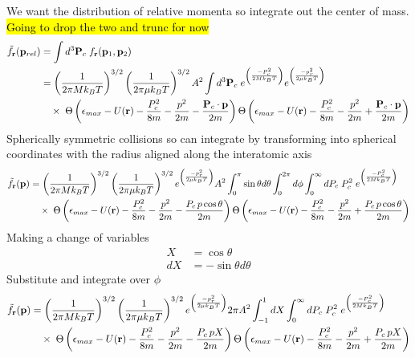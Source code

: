 We want the distribution of relative momenta so integrate out the center of mass. \hl{Going to drop the two and trunc for now}
\begin{equation}
\begin{split}
	 \tilde{f}_{\mathbf{r}}(\mathbf{p}_{rel}) & = \int d^3 \mathbf{P}_c \; f_{\mathbf{r}} (\mathbf{p}_1, \mathbf{p}_2) \\
	 &= \left(\frac{1}{2 \pi M k_B T}\right)^{3/2} \left(\frac{1}{2 \pi \mu k_B T}\right)^{3/2} A^2 \int d^3 \mathbf{P}_c \; e^{\left(\frac{-P_c^2}{2 M k_B T}\right)} e^{\left(\frac{-p_r^2}{2 \mu k_B T}\right)} \\ 
	 &\quad \times \; \Theta \left( {\epsilon_{max} - U(\mathbf{r}) - \frac{P_c^2}{8m} - \frac{p^2}{2m} - \frac{\mathbf{P}_c \cdot \mathbf{p}}{2m}} \right) \Theta \left( {\epsilon_{max} - U(\mathbf{r}) - \frac{P_c^2}{8m} - \frac{p^2}{2m} + \frac{\mathbf{P}_c \cdot \mathbf{p}}{2m}} \right) 
\end{split}
\end{equation}
Spherically symmetric collisions so can integrate by transforming into spherical coordinates with the radius aligned along the interatomic axis
\begin{equation}
\begin{split}
	 \tilde{f}_{\mathbf{r}}(\mathbf{p}) &= \left(\frac{1}{2 \pi M k_B T}\right)^{3/2} \left(\frac{1}{2 \pi \mu k_B T}\right)^{3/2} e^{\left(\frac{-p_r^2}{2 \mu k_B T}\right)} A^2  \int_0^{\pi} \sin \theta d\theta \int_0^{2\pi} d\phi \int_0^{\infty} dP_c \; P_c^2 \; e^{\left(\frac{-P_c^2}{2 M k_B T}\right)} \\ 
	 &\quad \times \; \Theta \left( {\epsilon_{max} - U(\mathbf{r}) - \frac{P_c^2}{8m} - \frac{p^2}{2m} - \frac{P_c \, p \cos \theta}{2m}} \right) \Theta \left( {\epsilon_{max} - U(\mathbf{r}) - \frac{P_c^2}{8m} - \frac{p^2}{2m} + \frac{P_c \, p \cos \theta}{2m}} \right) 
\end{split}
\end{equation}
Making a change of variables
\begin{equation*}
\begin{split}
	X  &= \cos \theta \\
	dX &= - \sin \theta d \theta
\end{split}
\end{equation*}
Substitute and integrate over $\phi$
\begin{equation}
\begin{split}
	 \tilde{f}_{\mathbf{r}}(\mathbf{p}) &= \left(\frac{1}{2 \pi M k_B T}\right)^{3/2} \left(\frac{1}{2 \pi \mu k_B T}\right)^{3/2} e^{\left(\frac{-p_r^2}{2 \mu k_B T}\right)} 2 \pi A^2  \int_{-1}^1 dX \int_0^{\infty} dP_c \; P_c^2 \; e^{\left(\frac{-P_c^2}{2 M k_B T}\right)} \\ 
	 &\quad \times \; \Theta \left( {\epsilon_{max} - U(\mathbf{r}) - \frac{P_c^2}{8m} - \frac{p^2}{2m} - \frac{P_c \, p X}{2m}} \right) \Theta \left( {\epsilon_{max} - U(\mathbf{r}) - \frac{P_c^2}{8m} - \frac{p^2}{2m} + \frac{P_c \, p X}{2m}} \right) 
\end{split}
\end{equation}
